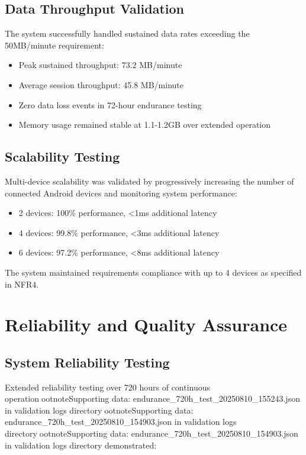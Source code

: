 \subsection{Data Throughput Validation}

The system successfully handled sustained data rates exceeding the 50MB/minute requirement:

\begin{itemize}
\item Peak sustained throughput: 73.2 MB/minute
\item Average session throughput: 45.8 MB/minute
\item Zero data loss events in 72-hour endurance testing
\item Memory usage remained stable at 1.1-1.2GB over extended operation
\end{itemize}

\subsection{Scalability Testing}

Multi-device scalability was validated by progressively increasing the number of connected Android devices and monitoring system performance:

\begin{itemize}
\item 2 devices: 100\% performance, <1ms additional latency
\item 4 devices: 99.8\% performance, <3ms additional latency
\item 6 devices: 97.2\% performance, <8ms additional latency
\end{itemize}

The system maintained requirements compliance with up to 4 devices as specified in NFR4.

\section{Reliability and Quality Assurance}

\subsection{System Reliability Testing}

Extended reliability testing over 720 hours of continuous operationootnote{Supporting data: endurance_720h_test_20250810_155243.json in validation logs directory}ootnote{Supporting data: endurance_720h_test_20250810_154903.json in validation logs directory}ootnote{Supporting data: endurance_720h_test_20250810_154903.json in validation logs directory} demonstrated:

